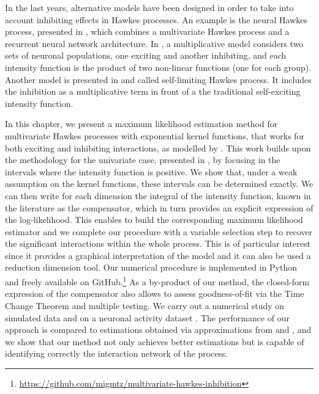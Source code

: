In the last years,
alternative models have been designed in order to take into account inhibiting effects in Hawkes processes.
An example is the neural Hawkes process, presented in \textcite{Mei2017,Zuo2021}, which combines a multivariate Hawkes process and a recurrent neural network architecture.
In \textcite{Duval2021}, a multiplicative model considers two sets of neuronal populations, one exciting and another inhibiting, and each intensity function is the product of two non-linear functions (one for each group).
Another model is presented in \textcite{Olinde2020} and called self-limiting Hawkes process.
It includes the inhibition as a multiplicative term in front of a the traditional self-exciting intensity function. 

In this chapter, we present a maximum likelihood estimation method for multivariate Hawkes processes with exponential kernel functions, that works for both exciting and inhibiting interactions, as modelled by \textcite{Bremaud1996, Chen2017}.
This work builds upon the methodology for the univariate case, presented in \textcite{bonnet2021}, by focusing in the intervals where the intensity function is positive.
We show that, under a weak assumption on the kernel functions, these intervals can be determined exactly.
We can then write for each dimension the integral of the intensity function, known in the literature as the compensator, which in turn provides an explicit expression of the log-likelihood.
This enables to build the corresponding maximum likelihood estimator and we complete our procedure with a variable selection step to recover the significant interactions within the whole process. This is of particular interest since it provides a graphical interpretation of the model and it can also be used a reduction dimension tool.
Our numerical procedure is implemented
in Python and freely available on GitHub.\footnote{\url{https://github.com/migmtz/multivariate-hawkes-inhibition}}
As a by-product of our method, the closed-form expression of the compensator also allows to assess goodness-of-fit via the Time Change Theorem and multiple testing.
We carry out a numerical study on simulated data and on a neuronal activity dataset \parencite{Petersen2016,Radosevic2019}.
The performance of our approach is compared to estimations obtained via approximations from \textcite{Bacry2020} and \textcite{Lemonnier2014}, and we show that our method not only achieves better estimations but is capable of identifying correctly the interaction network of the process.

